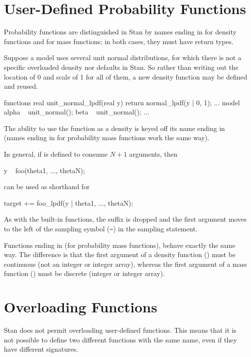 \section{User-Defined Probability Functions}

Probability functions are distinguished in Stan by names ending in
 for density functions and  for mass
functions; in both cases, they must have  return types.

Suppose a model uses several unit normal distributions, for which
there is not a specific overloaded density nor defaults in Stan.  So
rather than writing out the location of 0 and scale of 1 for all of
them, a new density function may be defined and reused.
%
\begin{stancode}
functions {
  real unit_normal_lpdf(real y) {
    return normal_lpdf(y | 0, 1);
  }
}
...
model {
  alpha ~ unit_normal();
  beta ~ unit_normal();
  ...
}
\end{stancode}
%
The ability to use the  function as a density is
keyed off its name ending in  (names ending in
 for probability mass functions work the same way).

In general, if  is defined to consume $N + 1$
arguments, then
%
\begin{stancode}
y ~ foo(theta1, ..., thetaN);
\end{stancode}
%
can be used as shorthand for
%
\begin{stancode}
target += foo_lpdf(y | theta1, ..., thetaN);
\end{stancode}
%
As with the built-in functions, the suffix  is dropped and
the first argument moves to the left of the sampling symbol (\Verb|~|)
in the sampling statement.

Functions ending in  (for probability mass functions),
behave exactly the same way.  The difference is that the first
argument of a density function () must be continuous (not
an integer or integer array), whereas the first argument of a mass
function () must be discrete (integer or integer array).


\section{Overloading Functions}

Stan does not permit overloading user-defined functions.  This means
that it is not possible to define two different functions with the
same name, even if they have different signatures.


